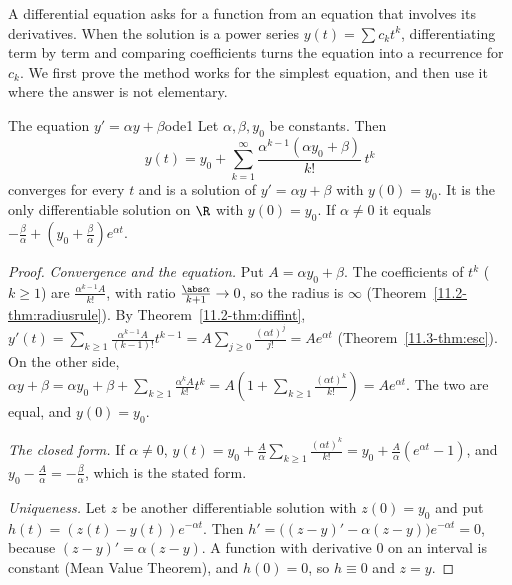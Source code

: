 \documentclass[11pt]{article}
\begin{document}
A differential equation asks for a function from an equation that involves its derivatives. When the solution is a power series $y(t)=\sum c_kt^k$, differentiating term by term and comparing coefficients turns the equation into a recurrence for $c_k$. We first prove the method works for the simplest equation, and then use it where the answer is not elementary.

\begin{thm}{The equation $y'=\alpha y+\beta$}{ode1}
Let $\alpha,\beta,y_0$ be constants. Then
\[
y(t)=y_0+\sum_{k=1}^\infty\frac{\alpha^{k-1}(\alpha y_0+\beta)}{k!}\,t^k
\]
converges for every $t$ and is a solution of $y'=\alpha y+\beta$ with $y(0)=y_0$. It is the only differentiable solution on $\R$ with $y(0)=y_0$. If $\alpha\ne0$ it equals $-\frac\beta\alpha+\left(y_0+\frac\beta\alpha\right)e^{\alpha t}$.
\end{thm}
\begin{proof}
\emph{Convergence and the equation.} Put $A=\alpha y_0+\beta$. The coefficients of $t^k$ ($k\ge1$) are $\frac{\alpha^{k-1}A}{k!}$, with ratio $\frac{\abs\alpha}{k+1}\to0$, so the radius is $\infty$ (Theorem~\ref{11.2-thm:radiusrule}). By Theorem~\ref{11.2-thm:diffint}, $y'(t)=\sum_{k\ge1}\frac{\alpha^{k-1}A}{(k-1)!}t^{k-1}=A\sum_{j\ge0}\frac{(\alpha t)^j}{j!}=Ae^{\alpha t}$ (Theorem~\ref{11.3-thm:esc}). On the other side, $\alpha y+\beta=\alpha y_0+\beta+\sum_{k\ge1}\frac{\alpha^kA}{k!}t^k=A\left(1+\sum_{k\ge1}\frac{(\alpha t)^k}{k!}\right)=Ae^{\alpha t}$. The two are equal, and $y(0)=y_0$.

\emph{The closed form.} If $\alpha\ne0$, $y(t)=y_0+\frac A\alpha\sum_{k\ge1}\frac{(\alpha t)^k}{k!}=y_0+\frac A\alpha(e^{\alpha t}-1)$, and $y_0-\frac A\alpha=-\frac\beta\alpha$, which is the stated form.

\emph{Uniqueness.} Let $z$ be another differentiable solution with $z(0)=y_0$ and put $h(t)=(z(t)-y(t))e^{-\alpha t}$. Then $h'=\bigl((z-y)'-\alpha(z-y)\bigr)e^{-\alpha t}=0$, because $(z-y)'=\alpha(z-y)$. A function with derivative $0$ on an interval is constant (Mean Value Theorem), and $h(0)=0$, so $h\equiv0$ and $z=y$.
\end{proof}
\end{document}
